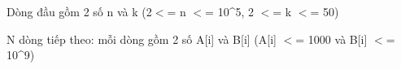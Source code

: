 Dòng đầu gồm 2 số n và k (2$<$= n $<$= 10\textasciicircum5, 2 $<$= k $<$= 50)

N dòng tiếp theo: mỗi dòng gồm 2 số A[i] và B[i] (A[i] $<$= 1000 và B[i] $<$= 10\textasciicircum9)